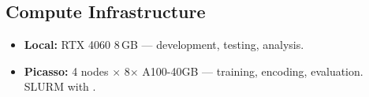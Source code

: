 \subsection{Compute Infrastructure}

\begin{itemize}[nosep]
  \item \textbf{Local:} RTX 4060 8\,GB --- development, testing, analysis.
  \item \textbf{Picasso:} 4 nodes $\times$ 8$\times$ A100-40GB --- training,
        encoding, evaluation.  SLURM with .
\end{itemize}
